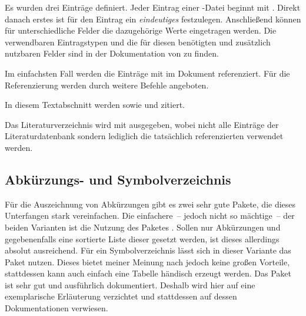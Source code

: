 \documentclass[%
  english,ngerman,%
  geometry=no,DIV=12,automark,%
]{tudscrartcl}
\begin{document}
%
Es wurden drei Einträge definiert. Jeder Eintrag einer -Datei 
beginnt mit . Direkt danach erstes ist für den 
Eintrag ein \emph{eindeutiges}  festzulegen. Anschließend 
können für unterschiedliche Felder die dazugehörige Werte eingetragen werden. 
Die verwendbaren Eintragstypen und die für diesen benötigten und zusätzlich 
nutzbaren Felder sind in der Dokumentation von  zu finden.

Im einfachsten Fall werden die Einträge mit  im 
Dokument referenziert. Für die Referenzierung werden durch  
weitere Befehle angeboten.
%
\begin{Excerpt}
In diesem Textabschnitt werden \cite{knuth84} sowie \cite{goossens94} und 
\cite{hanisch14} zitiert.
\end{Excerpt}
%
Das Literaturverzeichnis wird mit  ausgegeben, wobei 
nicht alle Einträge der Literaturdatenbank sondern lediglich die tatsächlich 
referenzierten verwendet werden.
%
\begin{Excerpt*}
\printbibliography[heading=subbibliography]
\end{Excerpt*}
\begin{quoting}[rightmargin=0pt]
\vspace*{-\baselineskip}
\printbibliography[heading=subbibliography]
\end{quoting}


\subsection{Abkürzungs- und Symbolverzeichnis}
\label{sec:glossaries}
Für die Auszeichnung von Abkürzungen gibt es zwei sehr gute Pakete, die dieses 
Unterfangen stark vereinfachen. Die einfachere~-- jedoch nicht so mächtige~-- 
der beiden Varianten ist die Nutzung des Paketes . Sollen nur 
Abkürzungen und gegebenenfalls eine sortierte Liste dieser gesetzt werden, ist 
dieses allerdings absolut ausreichend. Für ein Symbolverzeichnis lässt sich in 
dieser Variante das Paket  nutzen. Dieses bietet meiner 
Meinung nach jedoch keine großen Vorteile, stattdessen kann auch einfach eine 
Tabelle händisch erzeugt werden. Das Paket  ist sehr gut und 
ausführlich dokumentiert. Deshalb wird hier auf eine exemplarische Erläuterung 
verzichtet und stattdessen auf dessen Dokumentationen verwiesen.
\end{document}
